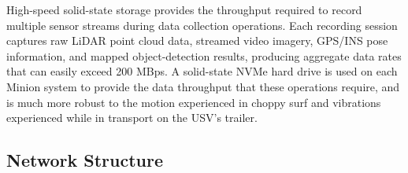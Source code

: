 \documentclass{erauthesis}
\begin{document}



High-speed solid-state storage provides the throughput required to record multiple sensor streams during data collection operations.
Each recording session captures raw \ac{LiDAR} point cloud data, streamed video imagery, GPS/INS pose information, and mapped object-detection results, producing aggregate data rates that can easily exceed 200 \ac{MBps}.
A solid-state NVMe hard drive is used on each Minion system to provide the data throughput that these operations require, and is much more robust to the motion experienced in choppy surf and vibrations experienced while in transport on the \ac{USV}'s trailer.




\subsection{Network Structure} \label{comp:network}
\end{document}
